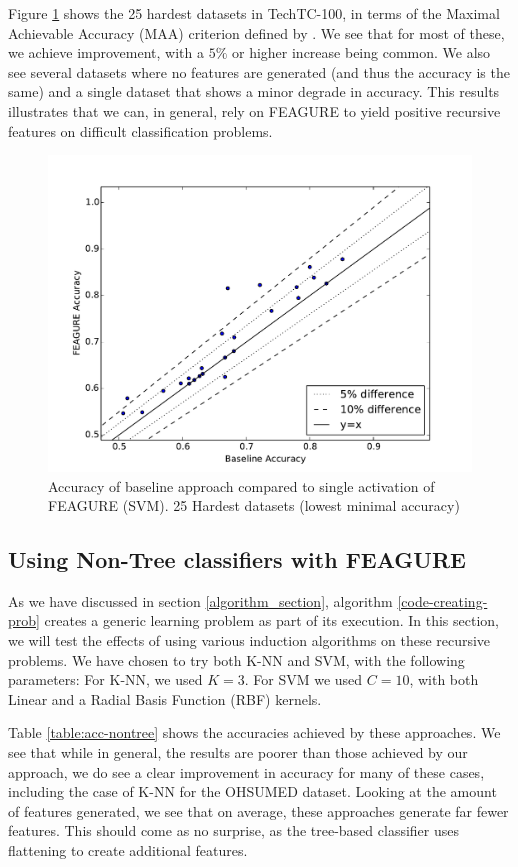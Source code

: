 \documentclass[twoside,11pt]{article}
\theoremstyle{definition}
\begin{document}
Figure \ref{fig:25best} shows the 25 hardest datasets in TechTC-100, in terms of the Maximal Achievable Accuracy (MAA) criterion defined by  . We see that for most of these, we achieve improvement, with a $5\%$ or higher increase being common. We also see several datasets where no features are generated (and thus the accuracy is the same) and a single dataset that shows a minor degrade in accuracy. This results illustrates that we can, in general, rely on FEAGURE to yield positive recursive features on difficult classification problems.

\begin{figure}
	\centering
	\includegraphics[width=0.8\linewidth]{new_svm_10_25hardest}
	\caption{Accuracy of
		baseline approach compared to single activation of FEAGURE (SVM). 25 Hardest datasets (lowest minimal accuracy)}
	\label{fig:25best}
\end{figure}

\subsection{Using Non-Tree classifiers with FEAGURE}

As we have discussed in section \ref{algorithm_section}, algorithm \ref{code-creating-prob} creates a generic learning problem as part of its execution. In this section, we will test the effects of using various induction algorithms on these recursive problems. We have chosen to try both K-NN and SVM, with the following parameters: For K-NN, we used $K=3$. For SVM we used $C=10$, with both Linear and a Radial Basis Function (RBF) kernels.

Table \ref{table:acc-nontree} shows the accuracies achieved by these approaches. We see that while in general, the results are poorer than those achieved by our approach, we do see a clear improvement in accuracy for many of these cases, including the case of K-NN for the OHSUMED dataset.
Looking at the amount of features generated, we see that on average, these approaches generate far fewer features. This should come as no surprise, as the tree-based classifier uses flattening to create additional features.
\end{document}
